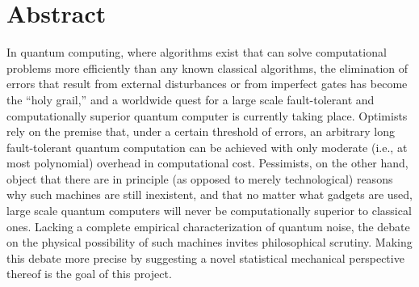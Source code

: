 \chapter*{Abstract}

In quantum computing, where algorithms
exist that can solve computational problems
more efficiently than any known classical
algorithms, the elimination of errors
that result from external disturbances
or from imperfect gates has become the
``holy grail,'' and a worldwide quest for
a large scale fault-tolerant and computationally
superior quantum computer is currently
taking place. Optimists rely on the premise
that, under a certain threshold of errors,
an arbitrary long fault-tolerant quantum
computation can be achieved with only
moderate (i.e., at most polynomial) overhead in computational cost.
Pessimists, on the other hand, object
that there are in principle (as opposed
to merely technological) reasons why such
machines are still inexistent, and that
no matter what gadgets are used, large
scale quantum computers will never be
computationally superior to classical
ones. Lacking a complete empirical characterization
of quantum noise, the debate on the physical
possibility of such machines invites philosophical
scrutiny. Making this debate more precise
by suggesting a novel statistical mechanical
perspective thereof is the goal of this project.
